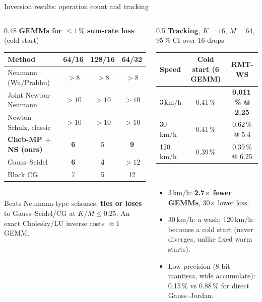 \documentclass[aspectratio=169,11pt,xcolor=table]{beamer}
\newcommand{\hl}[1]{\textcolor{accent}{\textbf{#1}}}
\newcommand{\best}[1]{\textbf{\textcolor{good}{#1}}}
\begin{document}
\begin{frame}{Inversion results: operation count and tracking}
  \footnotesize
  \begin{columns}[T]
    \begin{column}{0.48\textwidth}
      \textbf{GEMMs for $\le 1\,\%$ sum-rate loss} (cold start)\\[2pt]
      \begin{tabular}{lccc}
        \toprule
        Method & 64/16 & 128/16 & 64/32 \\
        \midrule
        Neumann (Wu/Prabhu) & $>8$ & $>8$ & $>8$ \\
        Joint Newton-Neumann & $>10$ & $>10$ & $>10$ \\
        Newton--Schulz, classic & $>10$ & $>10$ & $>10$ \\
        \textbf{Cheb-MP + NS (ours)} & \textbf{6} & 5 & \textbf{9} \\
        Gauss--Seidel & \textbf{6} & \textbf{4} & $>12$ \\
        Block CG & 7 & 5 & 12 \\
        \bottomrule
      \end{tabular}\\[3pt]
      Beats Neumann-type schemes; \hl{ties or loses} to Gauss--Seidel/CG at $K/M \le 0.25$. An exact Cholesky/LU inverse costs $\approx 1$ GEMM.
    \end{column}
    \begin{column}{0.5\textwidth}
      \textbf{Tracking}, $K{=}16$, $M{=}64$, 95\,\% CI over 16 drops\\[2pt]
      \begin{tabular}{lcc}
        \toprule
        Speed & Cold start (6 GEMM) & \textbf{RMT-WS} \\
        \midrule
        3\,km/h & 0.41\,\% & \best{0.011\,\% @ 2.25} \\
        30\,km/h & 0.41\,\% & 0.62\,\% @ 5.4 \\
        120\,km/h & 0.39\,\% & 0.39\,\% @ 6.25 \\
        \bottomrule
      \end{tabular}\\[3pt]
      \begin{itemize}
        \item 3\,km/h: \textbf{2.7$\times$ fewer GEMMs}, 30$\times$ lower loss.
        \item 30\,km/h: a wash; 120\,km/h: becomes a cold start (never diverges, unlike fixed warm starts).
        \item Low precision (8-bit mantissa, wide accumulate): 0.15\,\% vs 0.88\,\% for direct Gauss--Jordan.
      \end{itemize}
    \end{column}
  \end{columns}
\end{frame}
\end{document}
